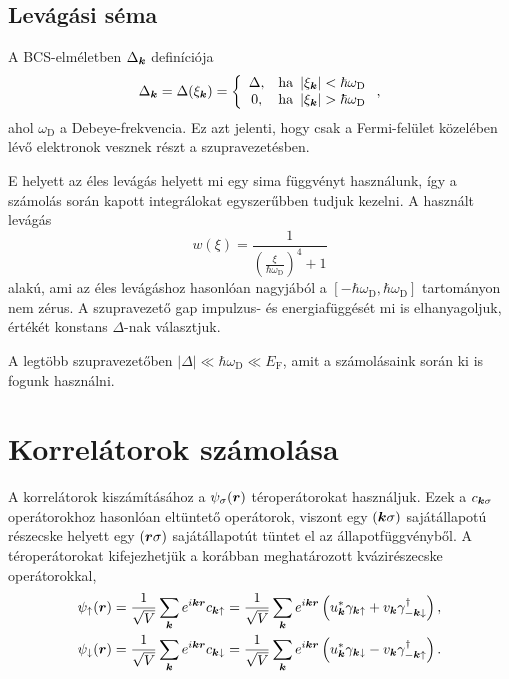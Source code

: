 \documentclass[a4paper,12pt,titlepage]{article}
\newcommand{\KK}{{\vb*{k}}}
\newcommand{\RR}{{\vb*{r}}}
\begin{document}
\subsection{Levágási séma}

A BCS-elméletben $\Delta_\KK$ definíciója
\begin{equation}
	\Delta_\KK = \Delta(\xi_\KK) = \left\{ \begin{array}{cl} \Delta, & \text{ha } \left| \xi_\KK \right| < \hbar \omega_\text{D} \\ 0, & \text{ha } \left| \xi_\KK \right| > \hbar \omega_\text{D} \end{array} \right. ,
\end{equation}
ahol $\omega_\text{D}$ a Debeye-frekvencia.  Ez azt jelenti, hogy csak a Fermi-felület közelében lévő elektronok vesznek részt a szupravezetésben.

E helyett az éles levágás helyett mi egy sima függvényt használunk, így a számolás során kapott integrálokat egyszerűbben tudjuk kezelni.  A használt levágás
\begin{equation} \label{cutoff}
	w(\xi) = \frac{1}{\left( \frac{\xi}{\hbar \omega_\text{D}} \right)^4 + 1}
\end{equation}
alakú, ami az éles levágáshoz hasonlóan nagyjából a $\left[ -\hbar \omega_\text{D}, \hbar \omega_\text{D} \right]$ tartományon nem zérus. A szupravezető gap impulzus- és energiafüggését mi is elhanyagoljuk, értékét konstans $\Delta$-nak választjuk.

A legtöbb szupravezetőben $\left|\Delta\right| \ll \hbar \omega_\text{D} \ll E_\text{F}$, amit a számolásaink során ki is fogunk használni.



\section{Korrelátorok számolása}

A korrelátorok kiszámításához a $\psi_\sigma(\RR)$ téroperátorokat használjuk.  Ezek a $c_{\KK \sigma}$ operátorokhoz hasonlóan eltüntető operátorok, viszont egy $\left( \KK \sigma \right)$ sajátállapotú részecske helyett egy $\left( \RR \sigma \right)$ sajátállapotút tüntet el az állapotfüggvényből.  A téroperátorokat kifejezhetjük a korábban meghatározott kvázirészecske operátorokkal,
\begin{equation} \label{psi}
\begin{split}
	\psi_\uparrow(\RR) & = \frac{1}{\sqrt{V}} \sum\limits_\KK e^{i \KK \RR} c_{\KK \uparrow} = \frac{1}{\sqrt{V}} \sum\limits_\KK e^{i \KK \RR} \left( u_\KK^* \gamma_{\KK \uparrow} + v_\KK \gamma_{-\KK \downarrow}^\dagger \right), \\
	\psi_\downarrow(\RR) & = \frac{1}{\sqrt{V}} \sum\limits_\KK e^{i \KK \RR} c_{\KK \downarrow} = \frac{1}{\sqrt{V}} \sum\limits_\KK e^{i \KK \RR} \left( u_\KK^* \gamma_{\KK \downarrow} - v_\KK \gamma_{-\KK \uparrow}^\dagger \right).
\end{split}
\end{equation}
\end{document}
